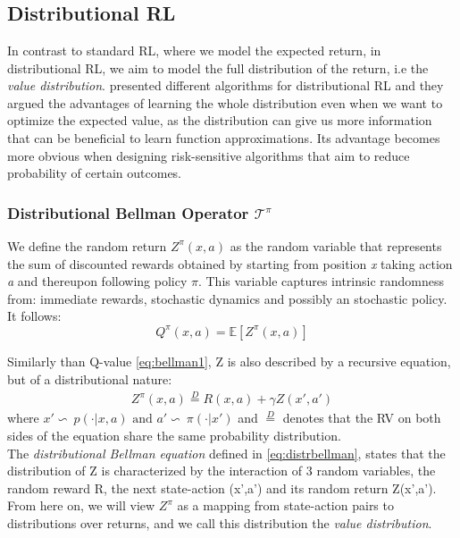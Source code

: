 \chapter{}\label{chap:appendix_distRL}
\section{Distributional RL} 

In contrast to standard RL, where we model the expected return, in distributional RL, we aim
to model the full distribution of the return, i.e the \textit{value distribution}.
\citet{Bellemare2017,Dabney2018a,Dabney2018b} presented different algorithms for distributional RL
and they argued the advantages of learning the whole distribution
even when we want to optimize the expected value, as the distribution can give us more information that
can be beneficial to learn function approximations.
Its advantage becomes more obvious when designing risk-sensitive algorithms that aim 
to reduce probability of
certain outcomes.

\subsection{Distributional Bellman Operator $\mathcal{T}^\pi$}

We define the random return $Z^\pi(x,a)$ as the random variable that represents the sum
of discounted rewards
obtained by 
starting from position \textit{x} taking action \textit{a} and thereupon following
policy $\pi$.
This variable captures intrinsic randomness from: immediate rewards, stochastic dynamics
and possibly an stochastic policy.
It follows:
\begin{equation}
    Q^\pi(x,a) = \mathbb E[Z^\pi(x,a)]
\end{equation}

Similarly than Q-value \ref{eq:bellman1}, Z is also described by a recursive equation, 
but of a distributional nature: 
\begin{eqnarray}
    Z^\pi(x,a) \stackrel{D}{=} R(x,a) + \gamma Z(x',a') \label{eq:distrbellman}
\end{eqnarray}
where $x'\backsim\ p(\cdot|x,a) \text{ and } a' \backsim\ \pi(\cdot |x')$ and $\stackrel{D}{=}$ 
denotes that the RV on both sides of the equation share the same
probability distribution.\\
The \textit{distributional Bellman equation} defined in \eqref{eq:distrbellman}, states
that the distribution of 
Z is characterized by the interaction of 3 random variables, the random reward R, the next
state-action (x',a') and its random return 
Z(x',a'). From here on, we will view $Z^\pi$ as a mapping from state-action pairs to
distributions over
returns, and we call this distribution the \textit{value distribution}.


